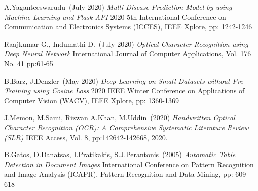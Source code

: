 \begin{thebibliography}{999}
A.Yaganteeswarudu~(July 2020)
{\it Multi Disease Prediction Model by using Machine Learning and Flask API} 
2020 5th International Conference on Communication and Electronics Systems (ICCES), IEEE Xplore, pp: 1242-1246

Raajkumar G., Indumathi D.~(July 2020)
{\it Optical Character Recognition using Deep Neural Network} 
International Journal of Computer Applications, Vol. 176 No. 41 pp:61-65

B.Barz, J.Denzler~(May 2020)
{\it Deep Learning on Small Datasets without Pre-Training using Cosine Loss} 
2020 IEEE Winter Conference on Applications of Computer Vision (WACV), IEEE Xplore, pp: 1360-1369

J.Memon, M.Sami, Rizwan A.Khan, M.Uddin~(2020)
{\it Handwritten Optical Character Recognition (OCR): A Comprehensive Systematic Literature Review (SLR)} 
IEEE Access, Vol. 8, pp:142642-142668, 2020.

B.Gatos, D.Danatsas, I.Pratikakis, S.J.Perantonis~(2005)
{\it Automatic Table Detection in Document Images}
International Conference on Pattern Recognition and Image Analysis (ICAPR), Pattern Recognition and Data Mining, pp: 609–618

\end{thebibliography}




